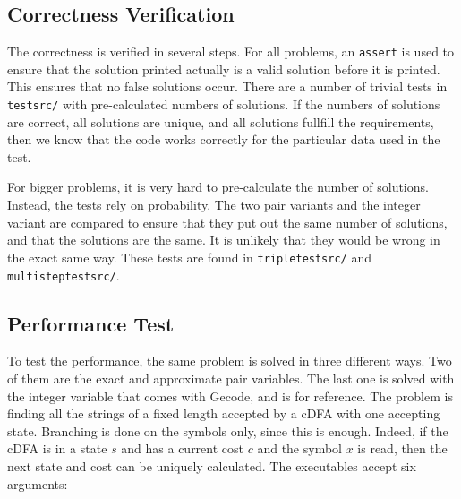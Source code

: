 \documentclass[a4paper,11pt]{article}
\begin{document}
\subsection{Correctness Verification}
The correctness is verified in several steps. For all problems, an \texttt{assert} is used to ensure that the solution printed actually is a valid solution before it is printed. This ensures that no false solutions occur. There are a number of trivial tests in \texttt{testsrc/} with pre-calculated numbers of solutions. If the numbers of solutions are correct, all solutions are unique, and all solutions fullfill the requirements, then we know that the code works correctly for the particular data used in the test.

For bigger problems, it is very hard to pre-calculate the number of solutions. Instead, the tests rely on probability. The two pair variants and the integer variant are compared to ensure that they put out the same number of solutions, and that the solutions are the same. It is unlikely that they would be wrong in the exact same way. These tests are found in \texttt{tripletestsrc/} and \texttt{multisteptestsrc/}.

\subsection{Performance Test}
\label{sec:performancetest}
To test the performance, the same problem is solved in three different ways. Two of them are the exact and approximate pair variables. The last one is solved with the integer variable that comes with Gecode, and is for reference. The problem is finding all the strings of a fixed length accepted by a cDFA with one accepting state. Branching is done on the symbols only, since this is enough. Indeed, if the cDFA is in a state $s$ and has a current cost $c$ and the symbol $x$ is read, then the next state and cost can be uniquely calculated. The executables accept six arguments: 
\end{document}
